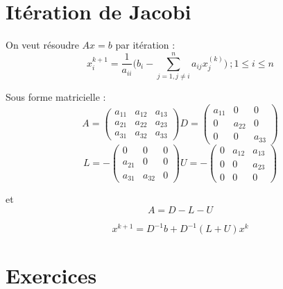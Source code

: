 \documentclass[a4paper,9pt]{extarticle}
\begin{document}
\section{Itération de Jacobi}
On veut résoudre $Ax=b$ par itération :
$$
x_i^{k+1} = \frac{1}{a_{ii}} \Big( b_i - \sum_{j=1,j\neq i}^n a_{ij}x_j^{(k)} \Big) \ ; 1\leq i \leq n
$$

Sous forme matricielle :
$$
A = \begin{pmatrix}
a_{11} & a_{12} & a_{13} \\
a_{21} & a_{22} & a_{23} \\
a_{31} & a_{32} & a_{33}
\end{pmatrix}
D = \begin{pmatrix}
a_{11} & 0 & 0 \\
0 & a_{22} & 0 \\
0 & 0 & a_{33}
\end{pmatrix}
$$
$$
L = -\begin{pmatrix}
0&0&0 \\
a_{21} & 0&0 \\
a_{31} & a_{32} &0
\end{pmatrix}
U = -\begin{pmatrix}
0 & a_{12} & a_{13} \\
0 & 0 & a_{23} \\
0&0&0
\end{pmatrix}
$$

et
$$
A = D - L - U
$$

$$
x^{k+1} = D^{-1}b+D^{-1}(L+U)x^k
$$

\section{Exercices}
\end{document}
